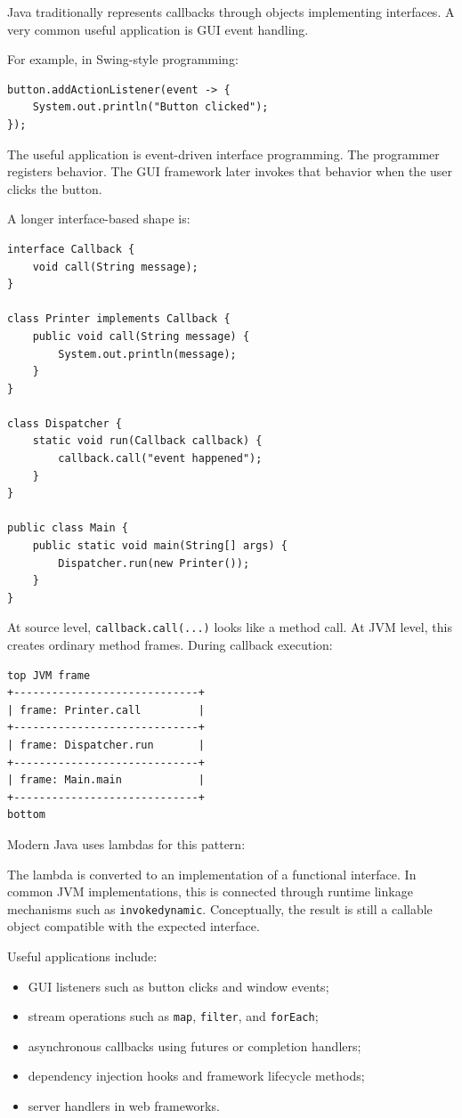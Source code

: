 Java traditionally represents callbacks through objects implementing interfaces. A very common useful application is GUI event handling.

For example, in Swing-style programming:

\begin{verbatim}
button.addActionListener(event -> {
    System.out.println("Button clicked");
});
\end{verbatim}

The useful application is event-driven interface programming. The programmer registers behavior. The GUI framework later invokes that behavior when the user clicks the button.

A longer interface-based shape is:

\begin{verbatim}
interface Callback {
    void call(String message);
}

class Printer implements Callback {
    public void call(String message) {
        System.out.println(message);
    }
}

class Dispatcher {
    static void run(Callback callback) {
        callback.call("event happened");
    }
}

public class Main {
    public static void main(String[] args) {
        Dispatcher.run(new Printer());
    }
}
\end{verbatim}

At source level, \texttt{callback.call(...)} looks like a method call. At JVM level, this creates ordinary method frames. During callback execution:

\begin{verbatim}
top JVM frame
+-----------------------------+
| frame: Printer.call         |
+-----------------------------+
| frame: Dispatcher.run       |
+-----------------------------+
| frame: Main.main            |
+-----------------------------+
bottom
\end{verbatim}

Modern Java uses lambdas for this pattern:

The lambda is converted to an implementation of a functional interface. In common JVM implementations, this is connected through runtime linkage mechanisms such as \texttt{invokedynamic}. Conceptually, the result is still a callable object compatible with the expected interface.

Useful applications include:

\begin{itemize}
    \item GUI listeners such as button clicks and window events;
    \item stream operations such as \texttt{map}, \texttt{filter}, and \texttt{forEach};
    \item asynchronous callbacks using futures or completion handlers;
    \item dependency injection hooks and framework lifecycle methods;
    \item server handlers in web frameworks.
\end{itemize}

